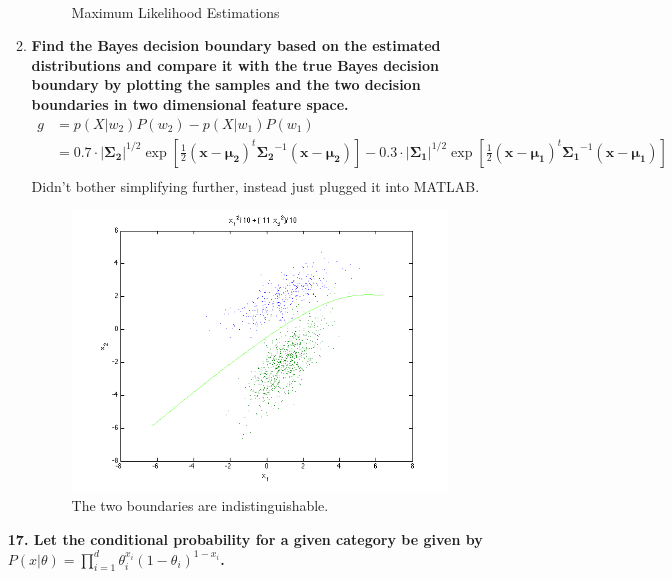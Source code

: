 \documentclass[12pt]{article}
\begin{document}
\begin{enumerate}
\begin{enumerate}
\begin{figure}[H]
\begin{equation}
\begin{split}
    \end{split}
    \end{equation}
    \caption{Maximum Likelihood Estimations}
    \end{figure}
  \item \textbf{Find the Bayes decision boundary based on the estimated distributions and compare it with the true Bayes decision boundary by plotting the samples and the two decision boundaries in two dimensional feature space.}
    \begin{equation}
    \begin{split}
      g& = p(X|w_2)P(w_2) - p(X|w_1)P(w_1) \\
      & = 0.7\cdot|\boldsymbol{\Sigma_2}|^{1/2} \exp\left[\frac{1}{2}(\mathbf{x}-\boldsymbol{\mu_2})^t\boldsymbol{\Sigma_2}^{-1}(\mathbf{x}-\boldsymbol{\mu_2})\right] -
 0.3\cdot|\boldsymbol{\Sigma_1}|^{1/2} \exp\left[\frac{1}{2}(\mathbf{x}-\boldsymbol{\mu_1})^t\boldsymbol{\Sigma_1}^{-1}(\mathbf{x}-\boldsymbol{\mu_1})\right] \\
    \end{split}
    \end{equation}
  Didn't bother simplifying further, instead just plugged it into MATLAB.
    \begin{figure}[H]
      \includegraphics{2b}
      \caption{The two boundaries are indistinguishable.}
    \end{figure}
  \end{enumerate}
  \subitem \textbf{17. Let the conditional probability for a given category be given by $P(x|\theta) = \prod_{i=1}^d\theta_i^{x_i}(1-\theta_i)^{1-x_i}$.}
  \begin{enumerate}

\end{enumerate}
\end{enumerate}
\end{document}
